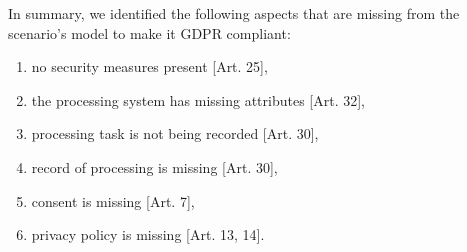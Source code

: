 In summary, we identified the following aspects that are missing from the
scenario's model to make it GDPR compliant:
\begin{enumerate}
  \item no security measures present [Art. 25],
  \item the processing system has missing attributes [Art. 32],
  \item processing task is not being recorded [Art. 30],
  \item record of processing is missing [Art. 30],
  \item consent is missing [Art. 7],
  \item privacy policy is missing [Art. 13, 14].
\end{enumerate}
